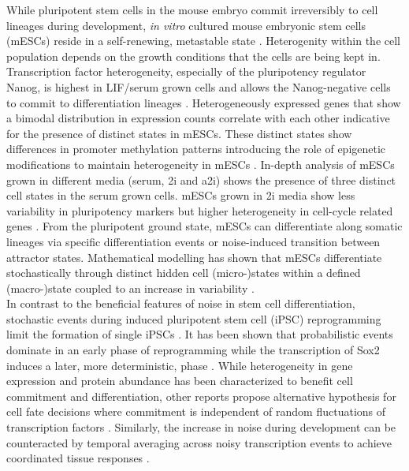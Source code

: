 While pluripotent stem cells in the mouse embryo commit irreversibly to cell lineages during development, \emph{in vitro} cultured mouse embryonic stem cells (mESCs) reside in a self-renewing, metastable state \citep{Hayashi2013}. Heterogenity within the cell population depends on the growth conditions that the cells are being kept in. Transcription factor heterogeneity, especially of the pluripotency regulator Nanog, is highest in LIF/serum grown cells and allows the Nanog-negative cells to commit to differentiation lineages \citep{Chickarmane2012, Torres-Padilla2014}. Heterogeneously expressed genes that show a bimodal distribution in expression counts correlate with each other indicative for the presence of distinct states in mESCs. These distinct states show differences in promoter methylation patterns introducing the role of epigenetic modifications to maintain heterogeneity in mESCs \citep{Singer2014a}. In-depth analysis of mESCs grown in different media (serum, 2i and a2i) shows the presence of three distinct cell states in the serum grown cells. mESCs grown in 2i media show less variability in pluripotency markers but higher heterogeneity in cell-cycle related genes \citep{Kolodziejczyk2015cell}. From the pluripotent ground state, mESCs can differentiate along somatic lineages via specific differentiation events or noise-induced transition between attractor states. Mathematical modelling has shown that mESCs differentiate stochastically through distinct hidden cell (micro-)states within a defined (macro-)state coupled to an increase in variability \cite{Stumpf2017}.\\

In contrast to the beneficial features of noise in stem cell differentiation, stochastic events during induced pluripotent stem cell (iPSC) reprogramming limit the formation of single iPSCs \citep{Hanna2009, Yamanaka2009}. It has been shown that probabilistic events dominate in an early phase of reprogramming while the transcription of Sox2 induces a later, more deterministic, phase \cite{Buganim2012}. While heterogeneity in gene expression and protein abundance has been characterized to benefit cell commitment and differentiation, other reports propose alternative hypothesis for cell fate decisions where commitment is independent of random fluctuations of transcription factors \cite{Hoppe2016}. Similarly, the increase in noise during development can be counteracted by temporal averaging across noisy transcription events to achieve coordinated tissue responses \citep{Stapel2017}. 

